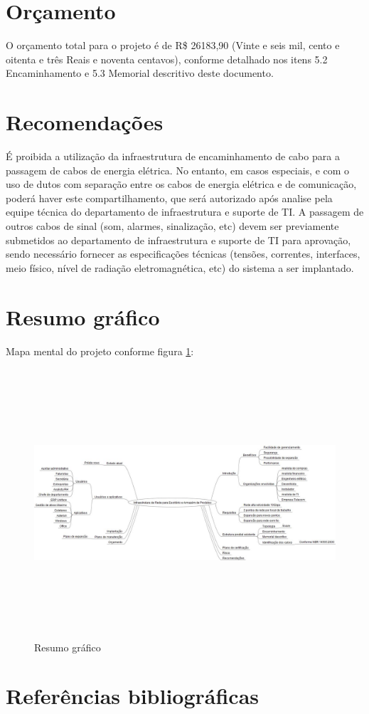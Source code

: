 \documentclass[	DIV=calc,%
							paper=a4,%
							fontsize=12pt,%
							onecolumn]{scrartcl}	 					%
\begin{document}
\section{Orçamento}
O orçamento total para o projeto é de R\$ 26183,90 (Vinte e seis mil, cento e oitenta e três Reais e noventa centavos), conforme detalhado nos itens 5.2 Encaminhamento e 5.3 Memorial descritivo deste documento. 

\section{Recomendações}
É proibida a utilização da infraestrutura de encaminhamento de cabo para a passagem de cabos de energia
elétrica. No entanto, em casos especiais, e com o uso de dutos com separação entre os cabos de energia elétrica e
de comunicação, poderá haver este compartilhamento, que será autorizado após analise pela equipe técnica do
departamento de infraestrutura e suporte de TI. A passagem de outros cabos de sinal (som, alarmes, sinalização, etc) devem ser previamente submetidos ao departamento de infraestrutura e suporte de TI para aprovação, sendo necessário fornecer as especificações técnicas (tensões, correntes, interfaces, meio físico, nível de radiação eletromagnética, etc) do sistema a ser implantado.

\section{Resumo gráfico}

Mapa mental do projeto conforme figura \ref{mapa_mental}:

\begin{figure}[h]
	\centering
	\includegraphics[width=\textwidth,height=10cm,keepaspectratio]{mapa_mental}
	\caption{Resumo gráfico}
	\label{mapa_mental}	
\end{figure}

\section{Referências bibliográficas}

\renewcommand\refname{} %

  
\end{document}
